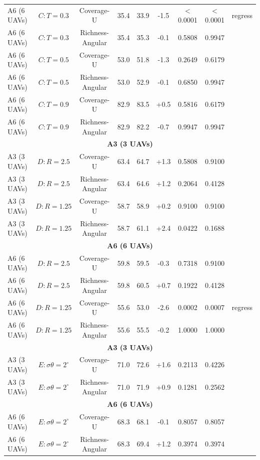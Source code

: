 \documentclass[journal]{IEEEtran}
\newcommand{\CU}{Coverage-U}
\newcommand{\RA}{Richness-Angular}
\begin{document}
\begin{table}[t]
\begin{tabular}{l c c c c c c c c}
\midrule
A6 (6 UAVs) & $C{:}T{=}0.3$ & \CU & 35.4 & 33.9 & -1.5 & $<$0.0001 & $<$0.0001 & regress \\
A6 (6 UAVs) & $C{:}T{=}0.3$ & \RA & 35.4 & 35.3 & -0.1 & 0.5808 & 0.9947 &  \\
A6 (6 UAVs) & $C{:}T{=}0.5$ & \CU & 53.0 & 51.8 & -1.3 & 0.2649 & 0.6179 &  \\
A6 (6 UAVs) & $C{:}T{=}0.5$ & \RA & 53.0 & 52.9 & -0.1 & 0.6850 & 0.9947 &  \\
A6 (6 UAVs) & $C{:}T{=}0.9$ & \CU & 82.9 & 83.5 & +0.5 & 0.5816 & 0.6179 &  \\
A6 (6 UAVs) & $C{:}T{=}0.9$ & \RA & 82.9 & 82.2 & -0.7 & 0.9947 & 0.9947 &  \\
\multicolumn{9}{c}{\textbf{A3 (3 UAVs)}} \\
\midrule
A3 (3 UAVs) & $D{:}R{=}2.5$ & \CU & 63.4 & 64.7 & +1.3 & 0.5808 & 0.9100 &  \\
A3 (3 UAVs) & $D{:}R{=}2.5$ & \RA & 63.4 & 64.6 & +1.2 & 0.2064 & 0.4128 &  \\
A3 (3 UAVs) & $D{:}R{=}1.25$ & \CU & 58.7 & 58.9 & +0.2 & 0.9100 & 0.9100 &  \\
A3 (3 UAVs) & $D{:}R{=}1.25$ & \RA & 58.7 & 61.1 & +2.4 & 0.0422 & 0.1688 &  \\
\multicolumn{9}{c}{\textbf{A6 (6 UAVs)}} \\
\midrule
A6 (6 UAVs) & $D{:}R{=}2.5$ & \CU & 59.8 & 59.5 & -0.3 & 0.7318 & 0.9100 &  \\
A6 (6 UAVs) & $D{:}R{=}2.5$ & \RA & 59.8 & 60.5 & +0.7 & 0.1922 & 0.4128 &  \\
A6 (6 UAVs) & $D{:}R{=}1.25$ & \CU & 55.6 & 53.0 & -2.6 & 0.0002 & 0.0007 & regress \\
A6 (6 UAVs) & $D{:}R{=}1.25$ & \RA & 55.6 & 55.5 & -0.2 & 1.0000 & 1.0000 &  \\
\multicolumn{9}{c}{\textbf{A3 (3 UAVs)}} \\
\midrule
A3 (3 UAVs) & $E{:}\sigma\theta{=}2^\circ$ & \CU & 71.0 & 72.6 & +1.6 & 0.2113 & 0.4226 &  \\
A3 (3 UAVs) & $E{:}\sigma\theta{=}2^\circ$ & \RA & 71.0 & 71.9 & +0.9 & 0.1281 & 0.2562 &  \\
\multicolumn{9}{c}{\textbf{A6 (6 UAVs)}} \\
\midrule
A6 (6 UAVs) & $E{:}\sigma\theta{=}2^\circ$ & \CU & 68.3 & 68.1 & -0.1 & 0.8057 & 0.8057 &  \\
A6 (6 UAVs) & $E{:}\sigma\theta{=}2^\circ$ & \RA & 68.3 & 69.4 & +1.2 & 0.3974 & 0.3974 &  \\
\bottomrule
\end{tabular}
\end{table}
\end{document}
